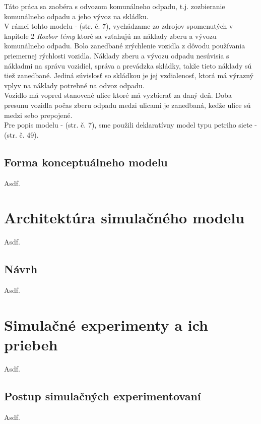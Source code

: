 \documentclass[11pt,a4paper]{article}
\begin{document}
    \indent Táto práca sa zaobéra s odvozom komunálneho odpadu, t.j. zozbieranie komunálneho odpadu a jeho vývoz na skládku.\\[0.4em]
    \indent V rámci tohto modelu - \cite{IMS}(str. č. 7), vychádzame zo zdrojov spomenutých v kapitole 2 \textit{Rozbor témy} ktoré sa vzťahujú na náklady zberu a vývozu komunálneho odpadu. Bolo zanedbané zrýchlenie vozidla z dôvodu používania priemernej rýchlosti vozidla. Náklady zberu a vývozu odpadu nesúvisia s nákladmi na správu vozidiel, správa a prevádzka skládky, takže tieto náklady sú tiež zanedbané. Jediná súvislosť so skládkou je jej vzdialenosť, ktorá má výrazný vplyv na náklady potrebné na odvoz odpadu.\\[0.4em]
    \indent Vozidlo má vopred stanovené ulice ktoré má vyzbierať za daný deň. Doba presunu vozidla počas zberu odpadu medzi ulicami je zanedbaná, keďže ulice sú medzi sebo prepojené.\\[0.4em]
    \indent Pre popis modelu - \cite{IMS}(str. č. 7), sme použili deklaratívny model typu petriho siete - \cite{IMS}(str. č. 49).

    \subsection{Forma konceptuálneho modelu}

        Asdf.


\section{Architektúra simulačného modelu}

    Asdf.

    \subsection{Návrh}

        Asdf.

\section{Simulačné experimenty a ich priebeh}

    Asdf.

    \subsection{Postup simulačných experimentovaní}

        Asdf.
\end{document}
